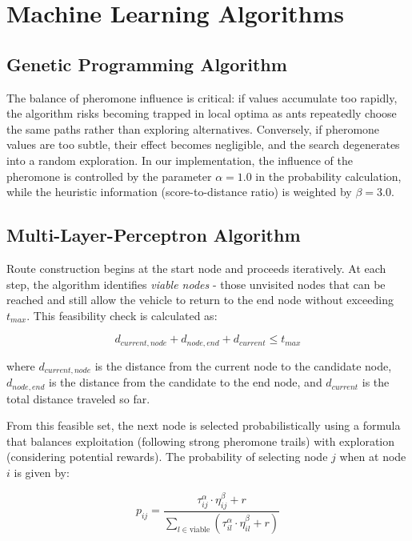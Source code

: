 \documentclass[a4paper,12pt]{article}
\begin{document}
\section{Machine Learning Algorithms}

\subsection{Genetic Programming Algorithm}
The balance of pheromone influence is critical: if values accumulate too rapidly, the algorithm risks becoming trapped in local optima as ants repeatedly choose the same paths rather than exploring alternatives. Conversely, if pheromone values are too subtle, their effect becomes negligible, and the search degenerates into a random exploration. In our implementation, the influence of the pheromone is controlled by the parameter $\alpha = 1.0$ in the probability calculation, while the heuristic information (score-to-distance ratio) is weighted by $\beta = 3.0$.

\subsection{Multi-Layer-Perceptron Algorithm}
Route construction begins at the start node and proceeds iteratively. At each step, the algorithm identifies \textit{viable nodes} - those unvisited nodes that can be reached and still allow the vehicle to return to the end node without exceeding $t_{max}$. This feasibility check is calculated as:

\begin{equation}
d_{current,node} + d_{node,end} + d_{current} \leq t_{max}
\end{equation}

where $d_{current,node}$ is the distance from the current node to the candidate node, $d_{node,end}$ is the distance from the candidate to the end node, and $d_{current}$ is the total distance traveled so far.

From this feasible set, the next node is selected probabilistically using a formula that balances exploitation (following strong pheromone trails) with exploration (considering potential rewards). The probability of selecting node $j$ when at node $i$ is given by:

\begin{equation}
p_{ij} = \frac{\tau_{ij}^{\alpha} \cdot \eta_{ij}^{\beta} + r}{\sum_{l \in \text{viable}} (\tau_{il}^{\alpha} \cdot \eta_{il}^{\beta} + r)}
\end{equation}
\end{document}
